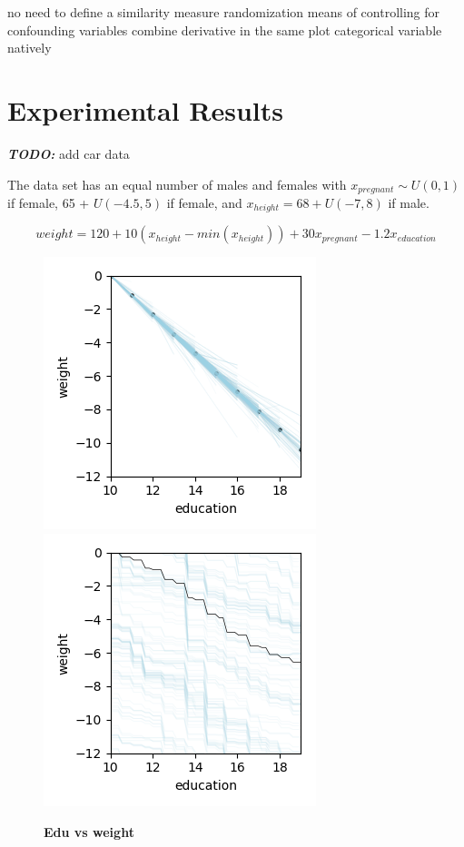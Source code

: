 \documentclass[12pt]{article}
\newcommand{\todo}[1]{{\bf\em TODO:} {{#1}}}
\begin{document}
 no need to define a similarity measure
randomization means of controlling for confounding variables
combine derivative in the same plot
categorical variable natively

\section{Experimental Results}

\todo{add car data}

The data set has an equal number of males and females with $x_{pregnant} \sim U(0,1)$ if female, 65 + $U(-4.5,5)$ if female, and $x_{height} = 68 + U(-7,8)$ if male. 

\[
weight = 120 + 10(x_{height} - min(x_{height})) + 30x_{pregnant} - 1.2x_{education}
\]

\begin{figure}[htbp]
\begin{center}
\includegraphics[scale=0.7]{images/education_vs_weight_stratpd.png}
\includegraphics[scale=0.7]{images/education_vs_weight_pdp.png}
\caption{{\bf  Edu vs weight}}
\label{fig:edu_vs_weight}
\end{center}
\end{figure}
\end{document}
